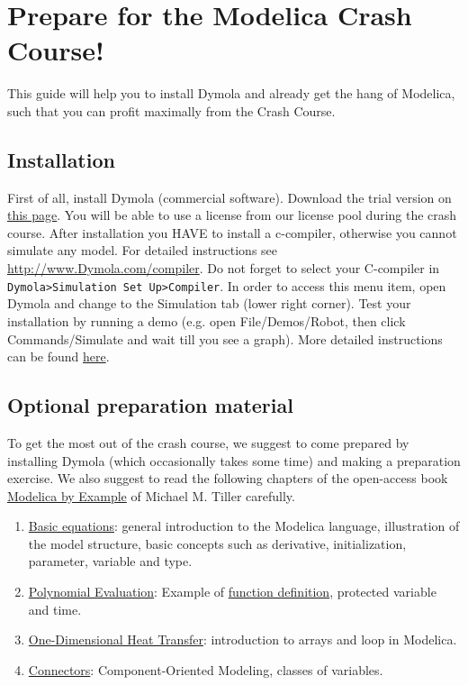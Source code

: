 \documentclass[10pt,a4paper]{article}
\author{Bram van der Heijde}
\begin{document}
\section*{Prepare for the Modelica Crash Course!}

This guide will help you to install Dymola and already get the hang of Modelica, such that you can profit maximally from the Crash Course. 

\subsection*{Installation}

First of all, install Dymola (commercial software).  Download the trial version on
\href{https://www.3ds.com/products-services/catia/products/dymola/trial-version/}{this page}. You will be able to use a license from our license pool during the crash course. 
After installation you HAVE to install a c-compiler, otherwise you 
cannot simulate any model.  
For detailed instructions see
\href{http://www.Dymola.com/compiler}{http://www.Dymola.com/compiler}.
Do not forget to select your C-compiler in \texttt{Dymola>Simulation Set 
Up>Compiler}. 
In order to access this menu item, open Dymola and change to the Simulation tab 
(lower right corner).
Test your installation by running a demo (e.g. open File/Demos/Robot, then 
click Commands/Simulate and wait till you see a graph). 
More detailed 
instructions can be found 
\href{https://www.3ds.com/fileadmin/PRODUCTS/CATIA/DYMOLA/PDF/Installation.pdf}{here}.

\subsection*{Optional preparation material}
To get the most out of the crash course, 
we suggest to come prepared by installing Dymola 
(which occasionally takes some time) and
making a preparation exercise.
We also suggest to read the following chapters of the open-access book  
\href{http://book.xogeny.com/}{Modelica by Example} of Michael M. Tiller 
carefully.

\begin{enumerate}
\item \href{http://book.xogeny.com/behavior/equations/}{Basic equations}: general introduction to the Modelica language, illustration of the model structure, basic concepts such as derivative, initialization, parameter, variable and type.
\item \href{http://book.xogeny.com/behavior/functions/polynomial/}{Polynomial 
Evaluation}: Example of 
\href{http://book.xogeny.com/behavior/functions/func_def/}{function 
definition}, protected variable and time.
\item \href{http://book.xogeny.com/behavior/arrays/oned/}{One-Dimensional Heat Transfer}: introduction to arrays and loop in Modelica.
\item	\href{http://book.xogeny.com/components/connectors/}{Connectors}: Component-Oriented Modeling, classes of variables.



\end{enumerate}
\end{document}
